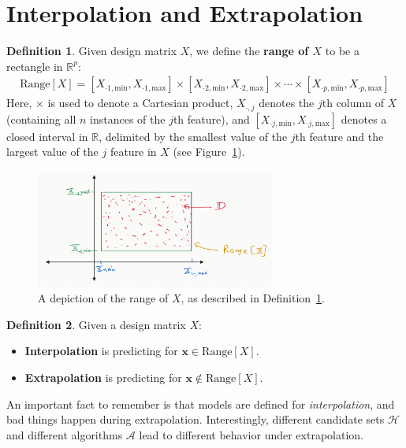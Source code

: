 \documentclass[12pt, a4paper]{article}
\theoremstyle{definition}
\newtheorem*{definition}{Definition}
\begin{document}
	\section*{Interpolation and Extrapolation}
	\begin{tcolorbox}[breakable]
		\begin{definition}
			\label{dfn:range-X-rectangle}
			Given design matrix $X$, we define the \textbf{range of $X$}
			to be a rectangle in $\mathbb{R}^{p}$:
			\begin{align*}
				\text{Range}[X] =
				[X_{\cdot 1,\text{min}}, X_{\cdot 1,\text{max}}] \times
				[X_{\cdot 2,\text{min}}, X_{\cdot 2,\text{max}}] \times
				\cdots \times
				[X_{\cdot p,\text{min}}, X_{\cdot p,\text{max}}]
			\end{align*}
			Here, $\times$ is used to denote a Cartesian product, $X_{\cdot, j}$
			denotes the $j$th column of $X$ (containing all $n$ instances of the
			$j$th feature), and $[X_{\cdot j,\text{min}}, X_{\cdot j,\text{max}}]$
			denotes a closed interval in $\mathbb{R}$, delimited by the smallest value of
			the $j$th feature and the largest value of the $j$ feature in $X$
			(see Figure~\ref{fig:range-X-rectangle}).
		\end{definition}
	\end{tcolorbox}
	\begin{figure}
		\centering
		\includegraphics[width=0.7\textwidth]{range-X-rectangle}
		\caption{A depiction of the range of $X$, as described in
			 Definition~\ref{dfn:range-X-rectangle}.}
	 	\label{fig:range-X-rectangle}
	\end{figure}
	\begin{tcolorbox}[breakable]
		\begin{definition}
			\label{ref:interpolation-extrapolation}
			Given a design matrix $X$:
			\begin{itemize}
				\item \textbf{Interpolation} is predicting for $\bm{x}\in \text{Range}[X]$.
				\item \textbf{Extrapolation} is predicting for $\bm{x}\notin \text{Range}[X]$.
			\end{itemize}
		\end{definition}
	\end{tcolorbox}
	An important fact to remember is that models are defined for \textit{interpolation},
	and bad things happen during extrapolation. Interestingly, different candidate
	sets $\mathcal{H}$ and different algorithms $\mathcal{A}$ lead to different
	behavior under extrapolation.
\end{document}
